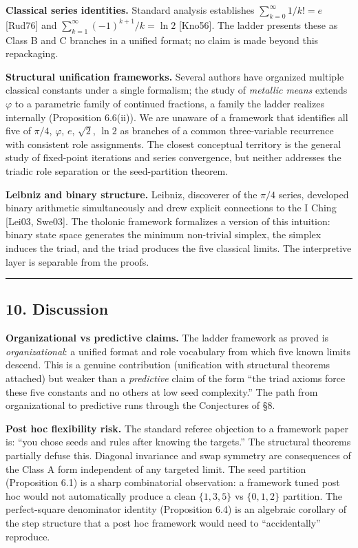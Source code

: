 \documentclass[
  11pt,
  letterpaper,
]{article}
\begin{document}
\textbf{Classical series identities.} Standard analysis establishes
\(\sum_{k=0}^\infty 1/k! = e\) {[}Rud76{]} and
\(\sum_{k=1}^\infty (-1)^{k+1}/k = \ln 2\) {[}Kno56{]}. The ladder
presents these as Class B and C branches in a unified format; no claim
is made beyond this repackaging.

\textbf{Structural unification frameworks.} Several authors have
organized multiple classical constants under a single formalism; the
study of \emph{metallic means} extends \(\varphi\) to a parametric
family of continued fractions, a family the ladder realizes internally
(Proposition 6.6(ii)). We are unaware of a framework that identifies all
five of \(\pi/4\), \(\varphi\), \(e\), \(\sqrt{2}\), \(\ln 2\) as
branches of a common three-variable recurrence with consistent role
assignments. The closest conceptual territory is the general study of
fixed-point iterations and series convergence, but neither addresses the
triadic role separation or the seed-partition theorem.

\textbf{Leibniz and binary structure.} Leibniz, discoverer of the
\(\pi/4\) series, developed binary arithmetic simultaneously and drew
explicit connections to the I Ching {[}Lei03, Swe03{]}. The tholonic
framework formalizes a version of this intuition: binary state space
generates the minimum non-trivial simplex, the simplex induces the
triad, and the triad produces the five classical limits. The
interpretive layer is separable from the proofs.

\begin{center}\rule{0.5\linewidth}{0.5pt}\end{center}

\subsection{10. Discussion}\label{discussion}

\textbf{Organizational vs predictive claims.} The ladder framework as
proved is \emph{organizational}: a unified format and role vocabulary
from which five known limits descend. This is a genuine contribution
(unification with structural theorems attached) but weaker than a
\emph{predictive} claim of the form ``the triad axioms force these five
constants and no others at low seed complexity.'' The path from
organizational to predictive runs through the Conjectures of §8.

\textbf{Post hoc flexibility risk.} The standard referee objection to a
framework paper is: ``you chose seeds and rules after knowing the
targets.'' The structural theorems partially defuse this. Diagonal
invariance and swap symmetry are consequences of the Class A form
independent of any targeted limit. The seed partition (Proposition 6.1)
is a sharp combinatorial observation: a framework tuned post hoc would
not automatically produce a clean \(\{1,3,5\}\) vs \(\{0,1,2\}\)
partition. The perfect-square denominator identity (Proposition 6.4) is
an algebraic corollary of the step structure that a post hoc framework
would need to ``accidentally'' reproduce.
\end{document}
